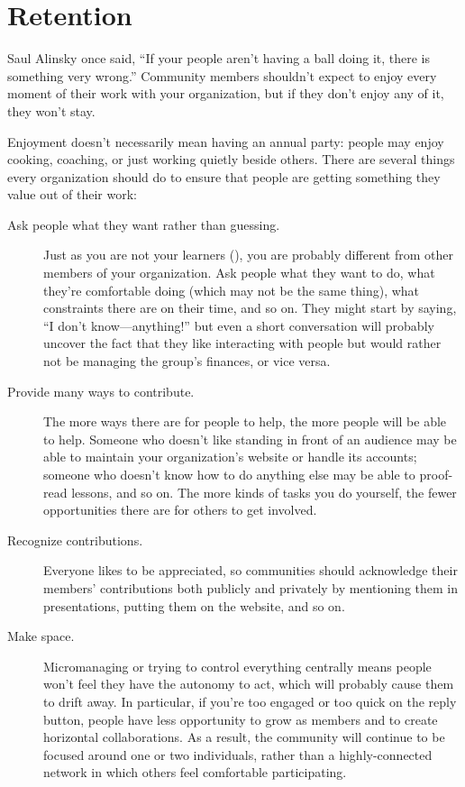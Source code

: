 \section{Retention}\label{s:community-retention}

Saul Alinsky once said, ``If your people aren't having a ball doing
it, there is something very wrong.'' \cite{Alin1989} Community members
shouldn't expect to enjoy every moment of their work with your
organization, but if they don't enjoy any of it, they won't stay.

Enjoyment doesn't necessarily mean having an annual party: people may
enjoy cooking, coaching, or just working quietly beside others. There
are several things every organization should do to ensure that people
are getting something they value out of their work:

\begin{description}

\item[Ask people what they want rather than guessing.] Just as you are
  not your learners (), you are probably
  different from other members of your organization. Ask people what
  they want to do, what they're comfortable doing (which may not be
  the same thing), what constraints there are on their time, and so
  on.  They might start by saying, ``I don't know---anything!'' but
  even a short conversation will probably uncover the fact that they
  like interacting with people but would rather not be managing the
  group's finances, or vice versa.

\item[Provide many ways to contribute.] The more ways there are for
  people to help, the more people will be able to help. Someone who
  doesn't like standing in front of an audience may be able to
  maintain your organization's website or handle its accounts; someone
  who doesn't know how to do anything else may be able to proof-read
  lessons, and so on. The more kinds of tasks you do yourself, the
  fewer opportunities there are for others to get involved.

\item[Recognize contributions.] Everyone likes to be appreciated, so
  communities should acknowledge their members' contributions both
  publicly and privately by mentioning them in presentations, putting
  them on the website, and so on.

\item[Make space.] Micromanaging or trying to control everything
  centrally means people won't feel they have the autonomy to act,
  which will probably cause them to drift away. In particular, if
  you're too engaged or too quick on the reply button, people have
  less opportunity to grow as members and to create horizontal
  collaborations.  As a result, the community will continue to be
  focused around one or two individuals, rather than a
  highly-connected network in which others feel comfortable
  participating.

\end{description}

